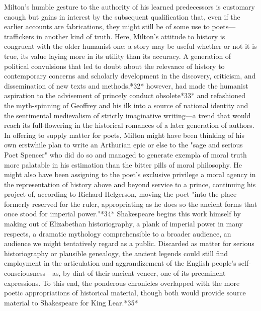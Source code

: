 Milton's humble gesture to the authority of his learned predecessors is customary enough but gains in interest by the subsequent qualification that, even if the earlier accounts are fabrications, they might still be of some use to poets—traffickers in another kind of truth. Here, Milton's attitude to history is congruent with the older humanist one: a story may be useful whether or not it is true, its value laying more in its utility than its accuracy. A generation of political convulsions  that led to doubt about the relevance of history to contemporary concerns and scholarly development in the discovery, criticism, and dissemination of new texts and methods,*32* however, had made the humanist aspiration to the advisement of princely conduct obsolete*33* and refashioned the myth-spinning of Geoffrey and his ilk into a source of national identity and the sentimental medievalism of strictly imaginative writing—a trend that would reach its full-flowering in the historical romances of a later generation of authors. In offering to supply matter for poets, Milton might have been thinking of his own erstwhile plan to write an Arthurian epic or else to the "sage and serious Poet Spencer" who did do so and managed to generate exempla of moral truth more palatable in his estimation than the bitter pills of moral philosophy. He might also have been assigning to the poet's exclusive privilege a moral agency in the representation of history above and beyond service to a prince, continuing his project of, according to Richard Helgerson, moving the poet "into the place formerly reserved for the ruler, appropriating as he does so the ancient forms that once stood for imperial power."*34* Shakespeare begins this work himself by making out of Elizabethan historiography, a plank of imperial power in many respects, a dramatic mythology comprehensible to a broader audience, an audience we might tentatively regard as a public. Discarded as matter for serious historiography or plausible genealogy, the ancient legends could still find employment in the articulation and aggrandizement of the English people's self-consciousness—as, by dint of their ancient veneer, one of its preeminent expressions. To this end, the ponderous chronicles overlapped with the more poetic appropriations of historical material, though both would provide source material to Shakespeare for King Lear.*35*

